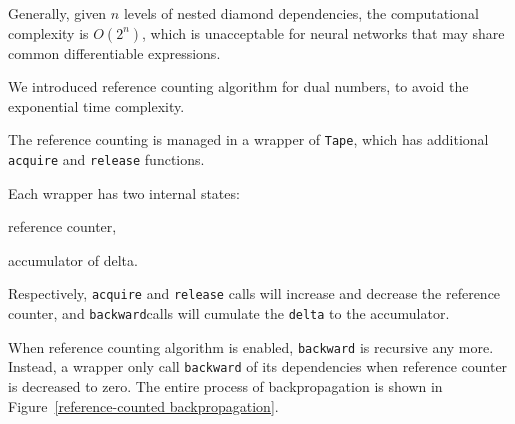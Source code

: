 Generally, given $n$ levels of nested diamond dependencies, the computational complexity is $O(2^n)$, which is unacceptable for neural networks that may share common \glspl{differentiable expression}.

We introduced reference counting algorithm for dual numbers, to avoid the exponential time complexity.

The reference counting is managed in a wrapper of \lstinline{Tape}, which has additional \lstinline{acquire} and \lstinline{release} functions.

Each wrapper has two internal states:
\begin{enumerate*}
  \item reference counter,
  \item accumulator of delta.
\end{enumerate*}
Respectively, \lstinline{acquire} and \lstinline{release} calls will increase and decrease the reference counter, and \lstinline{backward}calls will cumulate the \lstinline{delta} to the accumulator.

When reference counting algorithm is enabled, \lstinline{backward} is recursive any more. Instead, a wrapper only call \lstinline{backward} of its dependencies when reference counter is decreased to zero. The entire process of backpropagation is shown in Figure~\ref{reference-counted backpropagation}.

